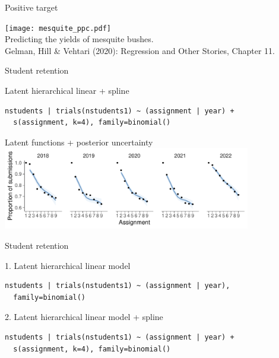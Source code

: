 \documentclass[t]{beamer}
\begin{document}
\begin{frame}{Positive target}
  
    \texttt{[image: mesquite\_ppc.pdf]}\\
  \vspace{-0.1\baselineskip} {Predicting the yields of mesquite bushes.\\
    \color{gray} \footnotesize
    Gelman, Hill \& Vehtari (2020): Regression and Other Stories, Chapter 11.}\\

\end{frame}

\begin{frame}[fragile]{Student retention}

  Latent hierarchical linear + spline

{\footnotesize
\begin{lstlisting}
nstudents | trials(nstudents1) ~ (assignment | year) +
  s(assignment, k=4), family=binomial()
\end{lstlisting}}

  Latent functions + posterior uncertainty
  \includegraphics[height=3.6cm]{student_retention_sbinom_linpreds.pdf}
  
\end{frame}

\begin{frame}[fragile]{Student retention}

1. Latent hierarchical linear model
{\footnotesize
\begin{lstlisting}
nstudents | trials(nstudents1) ~ (assignment | year),
  family=binomial()
\end{lstlisting}}

2. Latent hierarchical linear model + spline
{\footnotesize
\begin{lstlisting}
nstudents | trials(nstudents1) ~ (assignment | year) +
  s(assignment, k=4), family=binomial()
\end{lstlisting}}
  
\end{frame}
\end{document}
